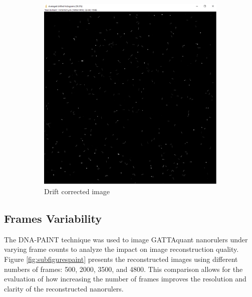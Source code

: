 \documentclass[a4paper,english,12pt,bibliography=totoc]{scrreprt}
\begin{document}
\begin{figure}[H]
\begin{subfigure}[b]{0.4\textwidth}
        \includegraphics[width=\textwidth]{Images/PAINT/widefieldwithoutdrift.png}
        \caption{Drift corrected image}
        \label{fig:driftcorrected}
    \end{subfigure}
    \caption{}
\end{figure}

\subsection{Frames Variability}
The DNA-PAINT technique was used to image GATTAquant nanorulers under varying frame counts to analyze the impact on image reconstruction quality. Figure \ref{fig:subfigurespaint} presents the reconstructed images using different numbers of frames: 500, 2000, 3500, and 4800. This comparison allows for the evaluation of how increasing the number of frames improves the resolution and clarity of the reconstructed nanorulers.
\end{document}
